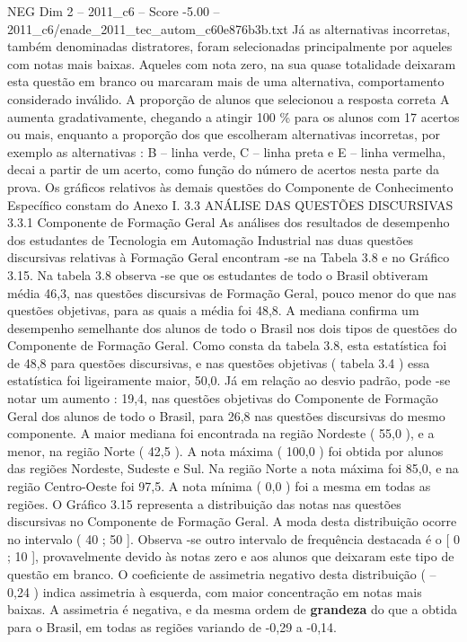 \begin{textsample}{NEG Dim 2 – 2011\_c6 – Score -5.00 – 2011\_c6/enade\_2011\_tec\_autom\_c60e876b3b.txt}
Já as alternativas incorretas, também denominadas distratores, foram selecionadas principalmente por aqueles com notas mais baixas.
Aqueles com nota zero, na sua quase totalidade deixaram esta questão em branco ou marcaram mais de uma alternativa, comportamento considerado inválido.
A proporção de alunos que selecionou a resposta correta A aumenta gradativamente, chegando a atingir 100 \% para os alunos com 17 acertos ou mais, enquanto a proporção dos que escolheram alternativas incorretas, por exemplo as alternativas : B – linha verde, C – linha preta e E – linha vermelha, decai a partir de um acerto, como função do número de acertos nesta parte da prova.
Os gráficos relativos às demais questões do Componente de Conhecimento Específico constam do Anexo I. 3.3 ANÁLISE DAS QUESTÕES DISCURSIVAS 3.3.1 Componente de Formação Geral As análises dos resultados de desempenho dos estudantes de Tecnologia em Automação Industrial nas duas questões discursivas relativas à Formação Geral encontram -se na Tabela 3.8 e no Gráfico 3.15.
Na tabela 3.8 observa -se que os estudantes de todo o Brasil obtiveram média 46,3, nas questões discursivas de Formação Geral, pouco menor do que nas questões objetivas, para as quais a média foi 48,8.
A mediana confirma um desempenho semelhante dos alunos de todo o Brasil nos dois tipos de questões do Componente de Formação Geral.
Como consta da tabela 3.8, esta estatística foi de 48,8 para questões discursivas, e nas questões objetivas ( tabela 3.4 ) essa estatística foi ligeiramente maior, 50,0.
Já em relação ao desvio padrão, pode -se notar um aumento : 19,4, nas questões objetivas do Componente de Formação Geral dos alunos de todo o Brasil, para 26,8 nas questões discursivas do mesmo componente.
A maior mediana foi encontrada na região Nordeste ( 55,0 ), e a menor, na região Norte ( 42,5 ).
A nota máxima ( 100,0 ) foi obtida por alunos das regiões Nordeste, Sudeste e Sul.
Na região Norte a nota máxima foi 85,0, e na região Centro-Oeste foi 97,5.
A nota mínima ( 0,0 ) foi a mesma em todas as regiões.
O Gráfico 3.15 representa a distribuição das notas nas questões discursivas no Componente de Formação Geral.
A moda desta distribuição ocorre no intervalo ( 40 ; 50 ].
Observa -se outro intervalo de frequência destacada é o [ 0 ; 10 ], provavelmente devido às notas zero e aos alunos que deixaram este tipo de questão em branco.
O coeficiente de assimetria negativo desta distribuição ( – 0,24 ) indica assimetria à esquerda, com maior concentração em notas mais baixas.
A assimetria é negativa, e da mesma ordem de \textbf{grandeza} do que a obtida para o Brasil, em todas as regiões variando de -0,29 a -0,14.

\end{textsample}
